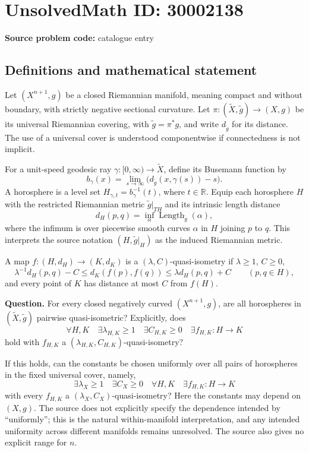 \documentclass[11pt]{article}
\newcommand{\R}{\mathbb{R}}
\begin{document}
\section*{UnsolvedMath ID: 30002138}
\textbf{Source problem code:} catalogue entry
\subsection{Definitions and mathematical statement}
Let \((X^{n+1},g)\) be a closed Riemannian manifold, meaning compact and without boundary, with strictly negative sectional curvature. Let \(\pi:(\widetilde X,\widetilde g)\to(X,g)\) be its universal Riemannian covering, with \(\widetilde g=\pi^*g\), and write \(d_{\widetilde g}\) for its distance. The use of a universal cover is understood componentwise if connectedness is not implicit.

For a unit-speed geodesic ray \(\gamma:[0,\infty)\to\widetilde X\), define its Busemann function by
\[
 b_\gamma(x)=\lim_{s\to\infty}\bigl(d_{\widetilde g}(x,\gamma(s))-s\bigr).
\]
A horosphere is a level set \(H_{\gamma,t}=b_\gamma^{-1}(t)\), where \(t\in\R\). Equip each horosphere \(H\) with the restricted Riemannian metric \(\widetilde g|_{TH}\) and its intrinsic length distance
\[
 d_H(p,q)=\inf_{\alpha}\operatorname{Length}_{\widetilde g}(\alpha),
\]
where the infimum is over piecewise smooth curves \(\alpha\) in \(H\) joining \(p\) to \(q\). This interprets the source notation \((H,\widetilde g|_H)\) as the induced Riemannian metric.

A map \(f:(H,d_H)\to(K,d_K)\) is a \((\lambda,C)\)-quasi-isometry if \(\lambda\ge1\), \(C\ge0\),
\[
 \lambda^{-1}d_H(p,q)-C\le d_K(f(p),f(q))\le\lambda d_H(p,q)+C
 \qquad(p,q\in H),
\]
and every point of \(K\) has distance at most \(C\) from \(f(H)\).

\textbf{Question.} For every closed negatively curved \((X^{n+1},g)\), are all horospheres in \((\widetilde X,\widetilde g)\) pairwise quasi-isometric? Explicitly, does
\[
 \forall H,K\quad\exists\lambda_{H,K}\ge1\quad\exists C_{H,K}\ge0\quad\exists f_{H,K}:H\to K
\]
hold with \(f_{H,K}\) a \((\lambda_{H,K},C_{H,K})\)-quasi-isometry?

If this holds, can the constants be chosen uniformly over all pairs of horospheres in the fixed universal cover, namely,
\[
 \exists\lambda_X\ge1\quad\exists C_X\ge0\quad\forall H,K\quad\exists f_{H,K}:H\to K
\]
with every \(f_{H,K}\) a \((\lambda_X,C_X)\)-quasi-isometry? Here the constants may depend on \((X,g)\). The source does not explicitly specify the dependence intended by ``uniformly''; this is the natural within-manifold interpretation, and any intended uniformity across different manifolds remains unresolved. The source also gives no explicit range for \(n\).
\end{document}
